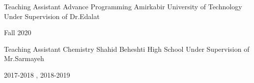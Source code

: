\newpage
{}


\begin{cventries}


  \cventry
    {Teaching Assistant} %
    {Advance Programming} %
    {Amirkabir University of Technology} %
    {Under Supervision of Dr.Edalat} %
    {
      \begin{cvitems} %
        Fall 2020
        \end{cvitems}
    }

  \cventry
    {Teaching Assistant} %
    {Chemistry} %
    {Shahid Beheshti High School} %
    {Under Supervision of Mr.Sarmayeh} %
    {
      \begin{cvitems} %
         2017-2018 , 2018-2019
        \end{cvitems}
    }

\end{cventries}

